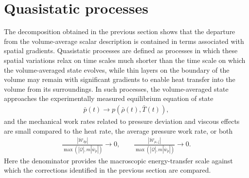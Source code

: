 \section{Quasistatic processes}
The decomposition obtained in the previous section shows that the departure from the volume-average scalar description is contained in terms associated with spatial gradients. Quasistatic processes are defined as processes in which these spatial variations relax on time scales much shorter than the time scale on which the volume-averaged state evolves, while thin layers on the boundary of the volume may remain with significant gradients to enable heat transfer into the volume from its surroundings. In such processes, the volume-averaged state approaches the experimentally measured equilibrium equation of state
\begin{align}
    \bar{p}(t)\to p(\bar{\rho}(t),\bar{T}(t)),
\end{align}
and the mechanical work rates related to pressure deviation and viscous effects are small compared to the heat rate, the average pressure work rate, or both
\begin{align}
    \frac{|\dot{\mathcal{W}}_{\delta p}|}{\max(|\dot{\mathcal{Q}}|,m|\dot{\bar{w}}_p|)}\to 0,\qquad \frac{|\dot{\mathcal{W}}_{\mu,\zeta}|}{\max(|\dot{\mathcal{Q}}|,m|\dot{\bar{w}}_p|)}\to 0.
\end{align}
Here the denominator provides the macroscopic energy-transfer scale against which the corrections identified in the previous section are compared.

